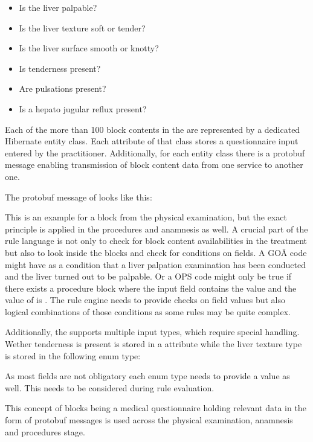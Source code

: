 \begin{itemize}
    \item Is the liver palpable?
    \item Is the liver texture soft or tender?
    \item Is the liver surface smooth or knotty?
    \item Is tenderness present?
    \item Are pulsations present?
    \item Is a hepato jugular reflux present?
\end{itemize}

Each of the more than 100 block contents in the \AVS are represented by a dedicated Hibernate entity class.
Each attribute of that class stores a questionnaire input entered by the practitioner.
Additionally, for each entity class there is a protobuf message enabling transmission of block content data from one service to another one.

The protobuf message of  looks like this:




This is an example for a block from the physical examination, but the exact principle is applied in the procedures and anamnesis as well.
A crucial part of the rule language is not only to check for block content availabilities in the treatment but also to look inside the blocks and check for conditions on fields.
A GOÄ code might have as a condition that a liver palpation examination has been conducted and the liver turned out to be palpable.
Or a OPS code might only be true if there exists a procedure block  where the input field  contains the value  and the value of  is .
The rule engine needs to provide checks on field values but also logical combinations of those conditions as some rules may be quite complex.

Additionally, the \AVS supports multiple input types, which require special handling.
Wether tenderness is present is stored in a  attribute while the liver texture type is stored in the following enum type:


As most fields are not obligatory each enum type needs to provide a  value as well.
This needs to be considered during rule evaluation.

This concept of blocks being a medical questionnaire holding relevant data in the form of protobuf messages is used across the physical examination, anamnesis and procedures stage.


